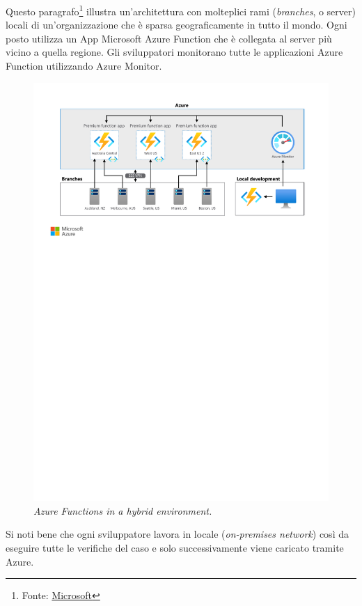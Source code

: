 \documentclass[a4paper]{article}
\begin{document}
	Questo paragrafo\footnote{Fonte: \href{https://learn.microsoft.com/en-us/azure/architecture/hybrid/azure-functions-hybrid}{Microsoft}} illustra un'architettura con molteplici rami (\emph{branches}, o server) locali di un'organizzazione che è sparsa geograficamente in tutto il mondo. Ogni posto utilizza un App Microsoft Azure Function che è collegata al server più vicino a quella regione. Gli sviluppatori monitorano tutte le applicazioni Azure Function utilizzando Azure Monitor.
	\begin{figure}[!htp]
		\centering
		\includegraphics[width=\textwidth]{img/azure-functions-hybrid.pdf}
		\caption{\emph{Azure Functions in a hybrid environment.}}
	\end{figure}
	Si noti bene che ogni sviluppatore lavora in locale (\emph{on-premises network}) così da eseguire tutte le verifiche del caso e solo successivamente viene caricato tramite Azure.\newpage
	
\end{document}
